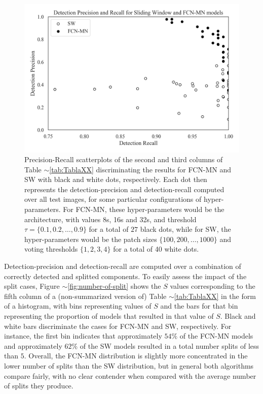 \documentclass[a4paper,authoryear,review]{elsarticle}
\begin{document}
 \begin{figure}
    \centering
    \includegraphics[width=\textwidth]{figures/111_precision_recall_detection.png}
    \caption{
Precision-Recall scatterplots of the second and third columns of Table $\sim$\ref{tab:TablaXX} discriminating the results for FCN-MN and SW with black and white dots, respectively. Each dot then represents the detection-precision and detection-recall computed over all test images, for some particular configurations of hyper-parameters. For FCN-MN, these hyper-parameters would be the architecture, with values 8s, 16s and 32s, and threshold $\tau = \{0.1, 0.2, \ldots, 0.9\}$  for a total of $27$ black dots, while for SW, the hyper-parameters would be the patch sizes  $\{100, 200, \ldots, 1000\}$ and voting thresholds $\{1, 2, 3, 4\}$ for a total of 40 white dots.
    }
    \label{fig:detection-scatter-plot}
\end{figure}


Detection-precision and detection-recall are computed over a combination of correctly detected and splitted components. To easily assess the impact of the split cases, Figure $\sim$\ref{fig:number-of-split} shows the $S$ values corresponding to the fifth column of a   (non-summarized version of) Table $\sim$\ref{tab:TablaXX} in the form of a histogram, with bins representing values of $S$ and the bars for that bin representing the proportion of models that resulted in that value of $S$. Black and white bars discriminate the cases for FCN-MN and SW, respectively. For instance, the first bin indicates that approximately $54\%$ of the FCN-MN models and approximately $62\%$ of the SW models resulted in a total number splits of less than $5$. Overall, the FCN-MN distribution is slightly more concentrated in the lower number of splits than the SW distribution, but in general both algorithms compare fairly, with no clear contender when compared with the average number of splits they produce. 
\end{document}
